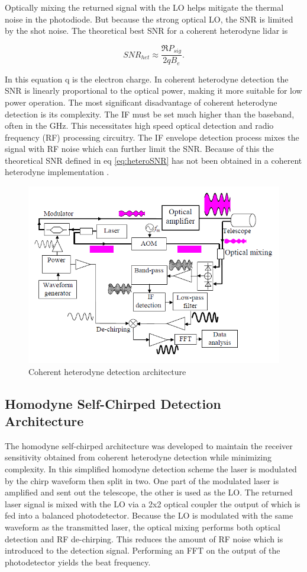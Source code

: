 Optically mixing the returned signal with the LO helps mitigate the thermal noise in the photodiode. But because
the strong optical LO, the SNR is limited by the shot noise. The theoretical best SNR for a coherent heterodyne 
lidar is

\begin{equation}
\label{eq:heteroSNR}
SNR_{het}\approx\frac{\Re P_{sig}}{2qB_e}. 
\end{equation}

In this equation q is the electron charge. In coherent heterodyne detection the SNR is linearly proportional to 
the optical power, making it more suitable for low power operation. The most significant disadvantage of coherent
heterodyne detection is its complexity. The IF must be set much higher than the baseband, often in the GHz. This 
necessitates high speed optical detection and radio frequency (RF) processing circuitry. The IF envelope detection
process mixes the signal with RF noise which can further limit the SNR. Because of this the theoretical SNR defined
in eq \ref{eq:heteroSNR} has not been obtained in a coherent heterodyne implementation \cite{1319mmPerf}.  

\begin{figure}[H]
	\centering
	\includegraphics[width=0.8\columnwidth]{figs/heterodyne}
	\vspace{1em}
	\caption{Coherent heterodyne detection architecture}
	\label{fig:heterodyneBlock}
\end{figure}


\subsection{Homodyne Self-Chirped Detection Architecture}
The homodyne self-chirped architecture was developed to maintain the receiver sensitivity obtained from coherent
heterodyne detection while minimizing complexity. In this simplified homodyne detection scheme the laser is 
modulated by the chirp waveform then split in two. One part of the modulated laser is amplified and sent out the
telescope, the other is used as the LO. The returned laser signal is mixed with the LO via a 2x2 optical coupler
the output of which is fed into a balanced photodetector. Because the LO is modulated with the same waveform as 
the transmitted laser, the optical mixing performs both optical detection and RF de-chirping. This reduces the 
amount of RF noise which is introduced to the detection signal. Performing an FFT on the output of the photodetector
yields the beat frequency. 

